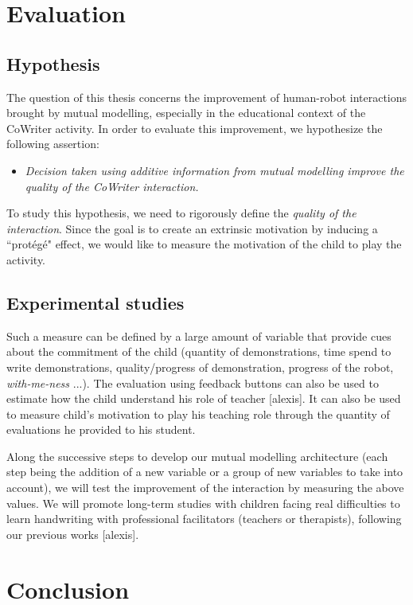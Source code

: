 \documentclass[10pt,a4paper,twocolumn]{article}
\begin{document}
\section{Evaluation}

\subsection{Hypothesis}

The question of this thesis concerns the improvement of human-robot interactions brought by mutual modelling, especially in the educational context of the CoWriter activity. In order to evaluate this improvement, we hypothesize the following assertion:
\begin{itemize}
\item \textit{Decision taken using additive information from mutual modelling improve the quality of the CoWriter interaction.}
\end{itemize}
To study this hypothesis, we need to rigorously define the \textit{quality of the interaction}. Since the goal is to create an extrinsic motivation by inducing a ``prot\'eg\'e" effect, we would like to measure the motivation of the child to play the activity.

\subsection{Experimental studies}

Such a measure can be defined by a large amount of variable that provide cues about the commitment of the child (quantity of demonstrations, time spend to write demonstrations, quality/progress of demonstration, progress of the robot, \textit{with-me-ness} ...). The evaluation using feedback buttons can also be used to estimate how the child understand his role of teacher [alexis]. It can also be used to measure child's motivation to play his teaching role through the quantity of evaluations he provided to his student. 

Along the successive steps to develop our mutual modelling architecture (each step being the addition of a new variable or a group of new variables to take into account), we will test the improvement of the interaction by measuring the above values. We will promote long-term studies with children facing real difficulties to learn handwriting with professional facilitators (teachers or therapists), following our previous works [alexis]. 

\section{Conclusion}





 
\end{document}

